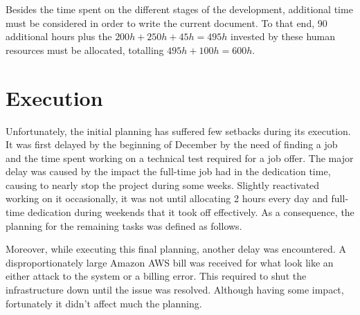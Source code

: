 Besides the time spent on the different stages of the development, additional time must be considered in order to write the current document. To that end, 90 additional hours plus the $200h + 250h + 45h = 495h$ invested by these human resources must be allocated, totalling $495h + 100h = 600h$.

\section{Execution}

Unfortunately, the initial planning has suffered few setbacks during its execution. It was first delayed by the beginning of December by the need of finding a job and the time spent working on a technical test required for a job offer. The major delay was caused by the impact the full-time job had in the dedication time, causing to nearly stop the project during some weeks. Slightly      reactivated working on it occasionally, it was not until allocating 2 hours every day and full-time dedication during weekends that it took off effectively. As a consequence, the planning for the remaining tasks was defined as follows.

Moreover, while executing this final planning, another delay was encountered. A disproportionately large Amazon AWS bill was received for what look like an either attack to the system or a billing error. This required to shut the infrastructure down until the issue was resolved. Although having some impact, fortunately it didn't affect much the planning.

